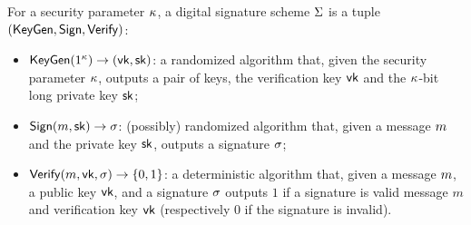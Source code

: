 \begin{definition}\label{def:digsign}
    For a security parameter $\kappa$, a digital signature scheme $\Sigma$
    is a tuple $(\mathsf{KeyGen},\mathsf{Sign},\mathsf{Verify})$:
    \begin{itemize}
        \item $\mathsf{KeyGen}(1^\kappa) \rightarrow (\mathsf{vk}, \mathsf{sk})$: a
            randomized algorithm that, given the security parameter
            $\kappa$, outputs a pair of keys, the verification key
            $\mathsf{vk}$ and the $\kappa$-bit long private key $\mathsf{sk}$;

        \item $\mathsf{Sign}(m, \mathsf{sk}) \rightarrow \sigma$: (possibly)
            randomized algorithm that, given a message $m$ and the private key
            $\mathsf{sk}$, outputs a signature $\sigma$;

        \item $\mathsf{Verify}(m, \mathsf{vk}, \sigma) \rightarrow \{0,1\}$: a
            deterministic algorithm that, given a message $m$, a public key
            $\mathsf{vk}$, and a signature $\sigma$ outputs $1$ if a
            signature is valid \wrt message $m$ and verification key
            $\mathsf{vk}$ (respectively $0$ if the signature is invalid).
    \end{itemize}
\end{definition}

